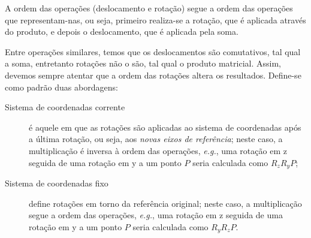 
A ordem das operações (deslocamento e rotação) segue a ordem das operações que representam-nas, ou seja, primeiro realiza-se a rotação, que é aplicada através do produto, e depois o deslocamento, que é aplicada pela soma.

Entre operações similares, temos que os deslocamentos são comutativos, tal qual a soma, entretanto rotações não o são, tal qual o produto matricial. Assim, devemos sempre atentar que a ordem das rotações altera os resultados. Define-se como padrão duas abordagens:
\begin{description}
    \item[Sistema de coordenadas corrente] é aquele em que as rotações são aplicadas ao sistema de coordenadas após a última rotação, ou seja, aos \emph{novas eixos de referência}; neste caso, a multiplicação é inversa à ordem das operações, \emph{e.g.}, uma rotação em z seguida de uma rotação em y a um ponto $P$ seria calculada como $R_zR_yP$;
    \item[Sistema de coordenadas fixo] define rotações em torno da referência original; neste caso, a multiplicação segue a ordem das operações, \emph{e.g.}, uma rotação em z seguida de uma rotação em y a um ponto $P$ seria calculada como $R_yR_zP$.
\end{description}

